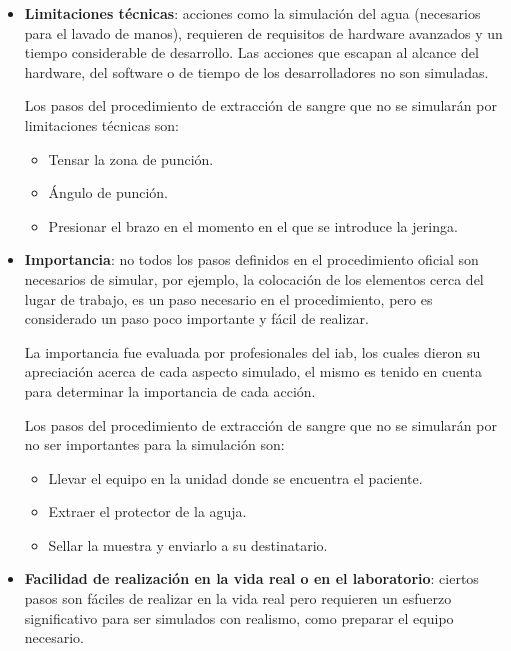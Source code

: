 \begin{itemize}
\item  \textbf{Limitaciones técnicas}: acciones como la simulación del agua        
    (necesarios para el lavado de manos), requieren de requisitos de
    hardware avanzados y un tiempo considerable de desarrollo. Las acciones
    que escapan al alcance del hardware, del software o de tiempo de los
    desarrolladores no son simuladas.
        
    Los pasos del procedimiento de extracción de sangre que no se simularán por 
    limitaciones técnicas son:
    \begin{itemize}
        \item Tensar la zona de punción.
        \item Ángulo de punción.
        \item Presionar el brazo en el momento en el que se introduce la jeringa.
    \end{itemize}
    
    
\item  \textbf{Importancia}: no todos los pasos definidos en el procedimiento        
    oficial son necesarios de simular, por ejemplo, la colocación de los
    elementos cerca del lugar de trabajo, es un paso necesario en el
    procedimiento, pero es considerado un paso poco importante y fácil de
    realizar.

    La importancia fue evaluada por profesionales del \Gls{iab}, los
    cuales dieron su apreciación acerca de cada aspecto simulado, el mismo
    es tenido en cuenta para determinar la importancia de cada
    acción.
    
    Los pasos del procedimiento de extracción de sangre que no se simularán por 
    no ser importantes para la simulación son:
    \begin{itemize}
        \item Llevar el equipo en la unidad donde se encuentra el paciente.
        \item Extraer el protector de la aguja.
        \item Sellar la muestra y enviarlo a su destinatario.
    \end{itemize}
    
    
\item \textbf{Facilidad de realización en la vida real o en el laboratorio}:
    ciertos pasos son fáciles de realizar en la vida real pero requieren un
    esfuerzo significativo para ser simulados con realismo, como preparar el
    equipo necesario.


\end{itemize}
